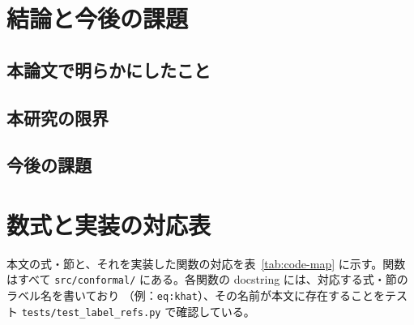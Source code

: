 \documentclass[a4paper,11pt]{jsarticle}
\theoremstyle{definition}
\theoremstyle{plain}
\theoremstyle{remark}
\begin{document}
\section{結論と今後の課題}

\subsection{本論文で明らかにしたこと}

\subsection{本研究の限界}

\subsection{今後の課題}

\appendix

\section{数式と実装の対応表}
\label{app:code-map}

本文の式・節と、それを実装した関数の対応を表~\ref{tab:code-map} に示す。関数はすべて
\texttt{src/conformal/} にある。各関数の docstring には、対応する式・節のラベル名を書いており
（例：\texttt{eq:khat}）、その名前が本文に存在することをテスト \texttt{tests/test\_label\_refs.py} で確認している。
\end{document}
